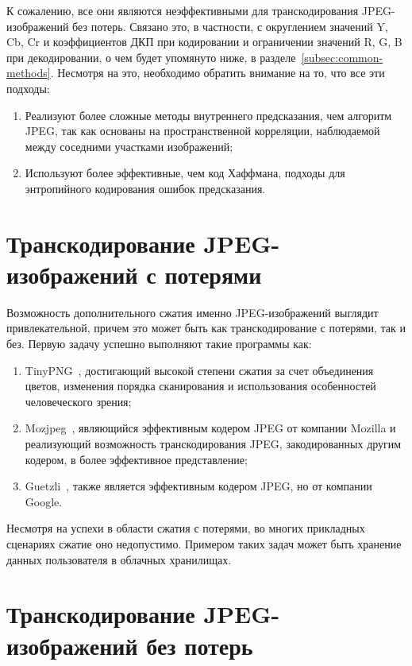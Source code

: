 \documentclass[times,specification,annotation]{itmo-student-thesis}
\begin{document}
К сожалению, все они являются неэффективными для транскодирования JPEG-изображений без потерь. Связано это, в частности, с округлением значений Y, Cb, Cr и коэффициентов ДКП при кодировании и ограничении значений R, G, B при декодировании, о чем будет упомянуто ниже, в разделе~\ref{subsec:common-methods}. Несмотря на это, необходимо обратить внимание на то, что все эти подходы:
\begin{enumerate}
    \item Реализуют более сложные методы внутреннего предсказания, чем алгоритм JPEG, так как основаны на пространственной корреляции, наблюдаемой между соседними участками изображений;
    \item Используют более эффективные, чем код Хаффмана, подходы для энтропийного кодирования ошибок предсказания.
\end{enumerate}

\section{Транскодирование JPEG-изображений с потерями}\label{sec:lossy-transcoding-overview}

Возможность дополнительного сжатия именно JPEG-изображений выглядит привлекательной, причем это может быть как транскодирование с потерями, так и без. Первую задачу успешно выполняют такие программы как:
\begin{enumerate}
    \item TinyPNG~\cite{tinypng-project}, достигающий высокой степени сжатия за счет объединения цветов, изменения порядка сканирования и использования особенностей человеческого зрения;
    \item Mozjpeg~\cite{mozjpeg-github-page}, являющийся эффективным кодером JPEG от компании Mozilla и реализующий возможность транскодирования JPEG, закодированных другим кодером, в более эффективное представление;
    \item Guetzli~\cite{guetzli-overview}, также является эффективным кодером JPEG, но от компании Google.
\end{enumerate}

Несмотря на успехи в области сжатия с потерями, во многих прикладных сценариях сжатие оно недопустимо. Примером таких задач может быть хранение данных пользователя в облачных хранилищах.

\section{Транскодирование JPEG-изображений без потерь}\label{sec:lossless-transcoding-overview}
\end{document}
